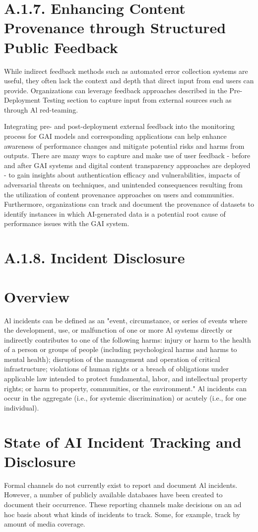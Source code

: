 \documentclass[10pt]{article}
\begin{document}
\section*{A.1.7. Enhancing Content Provenance through Structured Public Feedback}
While indirect feedback methods such as automated error collection systems are useful, they often lack the context and depth that direct input from end users can provide. Organizations can leverage feedback approaches described in the Pre-Deployment Testing section to capture input from external sources such as through Al red-teaming.

Integrating pre- and post-deployment external feedback into the monitoring process for GAI models and corresponding applications can help enhance awareness of performance changes and mitigate potential risks and harms from outputs. There are many ways to capture and make use of user feedback - before and after GAI systems and digital content transparency approaches are deployed - to gain insights about authentication efficacy and vulnerabilities, impacts of adversarial threats on techniques, and unintended consequences resulting from the utilization of content provenance approaches on users and communities. Furthermore, organizations can track and document the provenance of datasets to identify instances in which AI-generated data is a potential root cause of performance issues with the GAI system.
\section*{A.1.8. Incident Disclosure}
\section*{Overview}
Al incidents can be defined as an "event, circumstance, or series of events where the development, use, or malfunction of one or more Al systems directly or indirectly contributes to one of the following harms: injury or harm to the health of a person or groups of people (including psychological harms and harms to mental health); disruption of the management and operation of critical infrastructure; violations of human rights or a breach of obligations under applicable law intended to protect fundamental, labor, and intellectual property rights; or harm to property, communities, or the environment." Al incidents can occur in the aggregate (i.e., for systemic discrimination) or acutely (i.e., for one individual).
\section*{State of AI Incident Tracking and Disclosure}
Formal channels do not currently exist to report and document Al incidents. However, a number of publicly available databases have been created to document their occurrence. These reporting channels make decisions on an ad hoc basis about what kinds of incidents to track. Some, for example, track by amount of media coverage.
\end{document}
